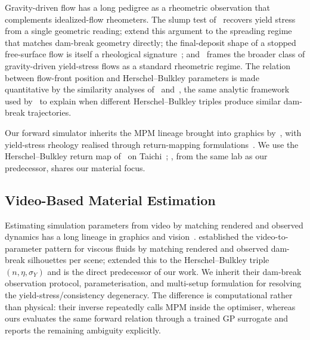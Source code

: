 Gravity-driven flow has a long pedigree as a rheometric observation
that complements idealized-flow rheometers. The slump test
of~\citet{pashias1996fifty} recovers yield stress from a single
geometric reading; \citet{roussel2005fiftycent} extend this argument
to the spreading regime that matches dam-break geometry directly;
the final-deposit shape of a stopped free-surface flow is itself a
rheological signature~\cite{coussot1996rheological};
and~\citet{ancey2007plasticity} frames the broader class of
gravity-driven yield-stress flows as a standard rheometric regime.
The relation between flow-front position and Herschel--Bulkley
parameters is made quantitative by the similarity analyses
of~\citet{liumei1989slow} and~\citet{balmforth2007two}, the same
analytic framework used by~\citet{hamamichi2023nonnewtonian} to
explain when different Herschel--Bulkley triples produce similar
dam-break trajectories.

Our forward simulator inherits the MPM lineage brought into
graphics by~\cite{stomakhin2013material,jiang2015affine,hu2018moving,
jiang2016material}, with yield-stress rheology realised through
return-mapping
formulations~\cite{yue2015continuum,ram2015material,klar2016drucker,
tampubolon2017multi,wolper2019cdmpm}. We use the Herschel--Bulkley
return map of~\citet{yue2015continuum} on
Taichi~\cite{hu2019taichi}; \citet{nagasawa2019mixing}, from the
same lab as our predecessor, shares our material focus.


\subsection{Video-Based Material Estimation}

Estimating simulation parameters from video by matching rendered and
observed dynamics has a long lineage in graphics and
vision~\cite{bhat2002computing,monszpart2016smash}.
\citet{takahashi2019video} established the video-to-parameter pattern
for viscous fluids by matching rendered and observed dam-break
silhouettes per scene; \citet{hamamichi2023nonnewtonian} extended
this to the Herschel--Bulkley triple $(n,\eta,\sigma_Y)$ and is the
direct predecessor of our work. We inherit their dam-break observation
protocol, parameterisation, and multi-setup formulation for resolving
the yield-stress/consistency degeneracy. The difference is
computational rather than physical: their inverse repeatedly calls
MPM inside the optimiser, whereas ours evaluates the same forward
relation through a trained GP surrogate and reports the remaining
ambiguity explicitly.

